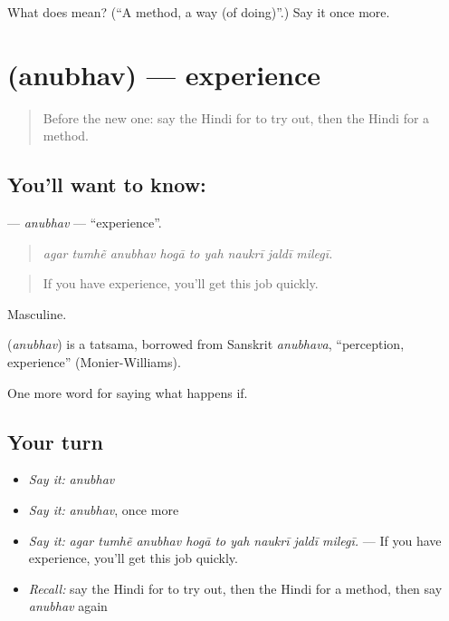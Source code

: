 \begin{tcolorbox}[breakable,colback=teal!4,colframe=teal!35!black,title={Before you move on}]
What does  mean? (\textquotedblleft{}A method, a way (of doing)\textquotedblright{}.) Say it once more.
\end{tcolorbox}
\section[\texorpdfstring{\hi{अनुभव} (anubhav)}{अनुभव (anubhav)}]{ (anubhav) — experience}

\label{lesson:HI-C392-anubhav}



\begin{quote}
Before the new one: say the Hindi for to try out, then the Hindi for a method.
\end{quote}

\subsection*{You'll want to know: }
\textbf{} — \emph{anubhav} — \textquotedblleft{}experience\textquotedblright{}.

\begin{quote}
        
\end{quote}

\begin{quote}
\emph{agar tumhẽ anubhav hogā to yah naukrī jaldī milegī.}
\end{quote}

\begin{quote}
If you have experience, you'll get this job quickly.
\end{quote}

Masculine.

\begin{cousinweb}
\textbf{} (\emph{anubhav}) is a tatsama, borrowed from Sanskrit \emph{anubhava}, \textquotedblleft{}perception, experience\textquotedblright{} (Monier-Williams).
\end{cousinweb}

\begin{grammarlens}[title={What you've built}]
One more word for saying what happens if.
\end{grammarlens}

\subsection*{Your turn}
\begin{itemize}
\raggedright
  \item \emph{Say it:} \emph{anubhav}
  \item \emph{Say it:} \emph{anubhav}, once more
  \item \emph{Say it:} \emph{agar tumhẽ anubhav hogā to yah naukrī jaldī milegī.} — If you have experience, you'll get this job quickly.
  \item \emph{Recall:} say the Hindi for to try out, then the Hindi for a method, then say \emph{anubhav} again
\end{itemize}

